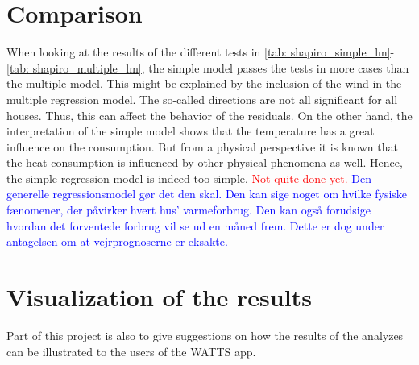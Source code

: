 \section{Comparison}
When looking at the results of the different tests in \cref{tab: shapiro_simple_lm}-\ref{tab: shapiro_multiple_lm}, the simple model passes the tests in more cases than the multiple model. This might be explained by the inclusion of the wind in the multiple regression model. The so-called directions are not all significant for all houses. Thus, this can affect the behavior of the residuals. On the other hand, the interpretation of the simple model shows that the temperature has a great influence on the consumption. But from a physical perspective it is known that the heat consumption is influenced by other physical phenomena as well. Hence, the simple regression model is indeed too simple. \textcolor{red}{Not quite done yet.} \textcolor{blue}{Den generelle regressionsmodel gør det den skal. Den kan sige noget om hvilke fysiske fænomener, der påvirker hvert hus' varmeforbrug. Den kan også forudsige hvordan det forventede forbrug vil se ud en måned frem. Dette er dog under antagelsen om at vejrprognoserne er eksakte.}

\section{Visualization of the results}
Part of this project is also to give suggestions on how the results of the analyzes can be illustrated to the users of the WATTS app. \\

